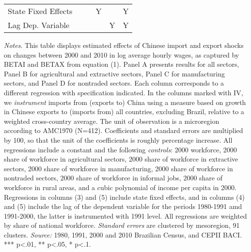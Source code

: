 \begin{center}
\begin{table}[h!]
\begin{center}
\begin{centering}
\begin{tabular}{lccccc}
\hline 
{\scriptsize{}State Fixed Effects} &  &  & {\scriptsize{}Y} &  & {\scriptsize{}Y}\tabularnewline
{\scriptsize{}Lag Dep. Variable} &  &  &  & {\scriptsize{}Y} & {\scriptsize{}Y}\tabularnewline
\hline 
\end{tabular}
\par\end{centering}
\medskip
\end{center}
\footnotesize
\emph{Notes}. This table displays estimated effects of Chinese import and export shocks on changes between 2000 and 2010 in log average hourly wages, as captured by BETAI and BETAX from equation (1). Panel A presents results for all sectors, Panel B for agricultural and extractive sectors, Panel C for manufacturing sectors, and Panel D for nontraded sectors. Each column corresponds to a different regression with specification indicated. In the columns marked with IV, we \emph{instrument} imports from (exports to) China using a measure based on growth in Chinese exports to (imports from) all countries, excluding Brazil, relative to a weighted cross-country average. The unit of observation is a microregion according to AMC1970 (N=412). Coefficients and standard errors are multiplied by 100, so that the unit of the coefficients is roughly percentage increase. All regressions include a constant and the following \emph{controls}: 2000 workforce, 2000 share of workforce in agricultural sectors, 2000 share of workforce in extractive sectors, 2000 share of workforce in manufacturing, 2000 share of workforce in nontraded sectors, 2000 share of workforce in informal jobs, 2000 share of workforce in rural areas, and a cubic polynomial of income per capita in 2000. Regressions in columns (3) and (5) include state fixed effects, and in columns (4) and (5) include the lag of the dependent variable for the periods 1980-1991 amd 1991-2000, the latter is instrumented with 1991 level. All regressions are weighted by share of national workforce.
 \emph{Standard errors} are clustered by mesoregion, 91 clusters. \emph{Source:} 1980, 1991, 2000 and 2010 Brazilian Census, and CEPII BACI. *** p<.01, ** p<.05, * p<.1.
\end{table}
\par \end{center}
